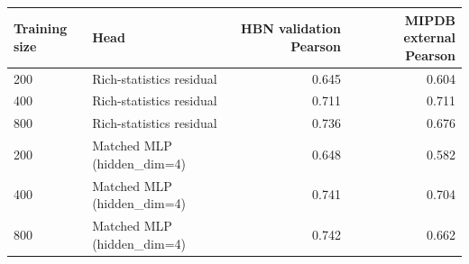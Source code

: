 \begin{tabular}{llrr}
\toprule
Training size & Head & HBN validation Pearson & MIPDB external Pearson \\
\midrule
200 & Rich-statistics residual & 0.645 & 0.604 \\
400 & Rich-statistics residual & 0.711 & 0.711 \\
800 & Rich-statistics residual & 0.736 & 0.676 \\
200 & Matched MLP (hidden\_dim=4) & 0.648 & 0.582 \\
400 & Matched MLP (hidden\_dim=4) & 0.741 & 0.704 \\
800 & Matched MLP (hidden\_dim=4) & 0.742 & 0.662 \\
\bottomrule
\end{tabular}

